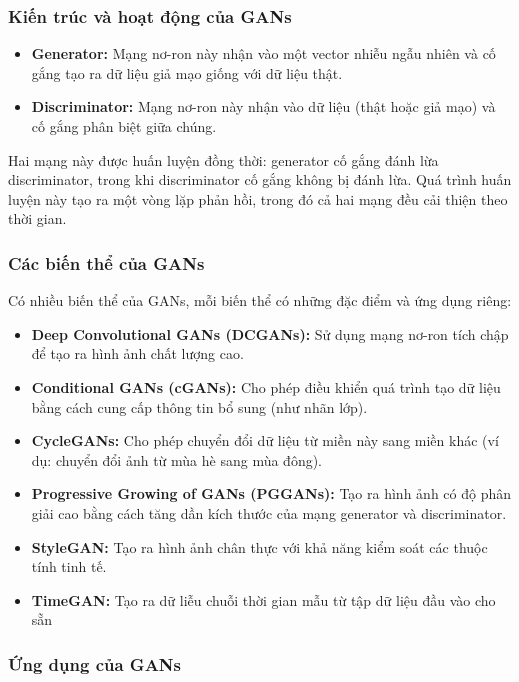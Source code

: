 \subsubsection{Kiến trúc và hoạt động của GANs}

\begin{itemize}
    \item \textbf{Generator:} Mạng nơ-ron này nhận vào một vector nhiễu ngẫu nhiên và cố gắng tạo ra dữ liệu giả mạo giống với dữ liệu thật.
    \item \textbf{Discriminator:} Mạng nơ-ron này nhận vào dữ liệu (thật hoặc giả mạo) và cố gắng phân biệt giữa chúng.
\end{itemize}
Hai mạng này được huấn luyện đồng thời: generator cố gắng đánh lừa discriminator, trong khi discriminator cố gắng không bị đánh lừa. Quá trình huấn luyện này tạo ra một vòng lặp phản hồi, trong đó cả hai mạng đều cải thiện theo thời gian.

\subsubsection{Các biến thể của GANs}

Có nhiều biến thể của GANs, mỗi biến thể có những đặc điểm và ứng dụng riêng:

\begin{itemize}
    \item \textbf{Deep Convolutional GANs (DCGANs):} Sử dụng mạng nơ-ron tích chập để tạo ra hình ảnh chất lượng cao.
    \item \textbf{Conditional GANs (cGANs):} Cho phép điều khiển quá trình tạo dữ liệu bằng cách cung cấp thông tin bổ sung (như nhãn lớp).
    \item \textbf{CycleGANs:} Cho phép chuyển đổi dữ liệu từ miền này sang miền khác (ví dụ: chuyển đổi ảnh từ mùa hè sang mùa đông).
    \item \textbf{Progressive Growing of GANs (PGGANs):}  Tạo ra hình ảnh có độ phân giải cao bằng cách tăng dần kích thước của mạng generator và discriminator.
    \item \textbf{StyleGAN:} Tạo ra hình ảnh chân thực với khả năng kiểm soát các thuộc tính tinh tế.
    \item \textbf{TimeGAN:} Tạo ra dữ liễu chuỗi thời gian mẫu từ tập dữ liệu đầu vào cho sẵn
\end{itemize}

\subsubsection{Ứng dụng của GANs}

